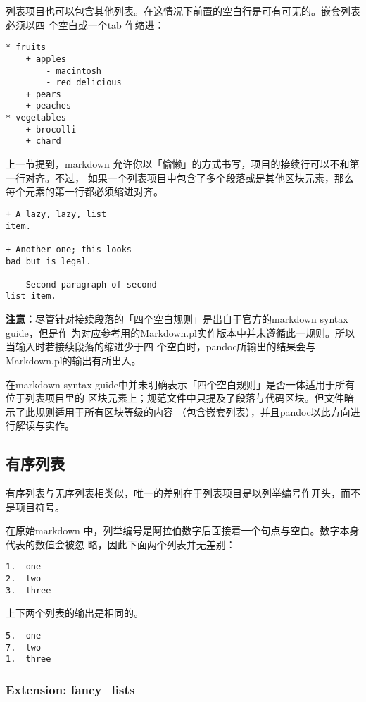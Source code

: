 \documentclass[fancyhdr,bookmark]{ctexbook}
\begin{document}
列表项目也可以包含其他列表。在这情况下前置的空白行是可有可无的。嵌套列表必须以四
个空白或一个tab 作缩进：

\begin{lstlisting}
* fruits
    + apples
        - macintosh
        - red delicious
    + pears
    + peaches
* vegetables
    + brocolli
    + chard
\end{lstlisting}

上一节提到，markdown
允许你以「偷懒」的方式书写，项目的接续行可以不和第一行对齐。不过，
如果一个列表项目中包含了多个段落或是其他区块元素，那么每个元素的第一行都必须缩进对齐。

\begin{lstlisting}
+ A lazy, lazy, list
item.

+ Another one; this looks
bad but is legal.

    Second paragraph of second
list item.
\end{lstlisting}

\textbf{注意：}尽管针对接续段落的「四个空白规则」是出自于官方的markdown
syntax guide，但是作
为对应参考用的Markdown.pl实作版本中并未遵循此一规则。所以当输入时若接续段落的缩进少于四
个空白时，pandoc所输出的结果会与Markdown.pl的输出有所出入。

在markdown syntax
guide中并未明确表示「四个空白规则」是否一体适用于所有位于列表项目里的
区块元素上；规范文件中只提及了段落与代码区块。但文件暗示了此规则适用于所有区块等级的内容
（包含嵌套列表），并且pandoc以此方向进行解读与实作。

\hypertarget{ux6709ux5e8fux5217ux8868}{%
\subsection{有序列表}\label{ux6709ux5e8fux5217ux8868}}

有序列表与无序列表相类似，唯一的差别在于列表项目是以列举编号作开头，而不是项目符号。

在原始markdown
中，列举编号是阿拉伯数字后面接着一个句点与空白。数字本身代表的数值会被忽
略，因此下面两个列表并无差别：

\begin{lstlisting}
1.  one
2.  two
3.  three
\end{lstlisting}

上下两个列表的输出是相同的。

\begin{lstlisting}
5.  one
7.  two
1.  three
\end{lstlisting}

\hypertarget{extension-fancy_lists}{%
\subsubsection{Extension: fancy\_lists}\label{extension-fancy_lists}}
\end{document}
